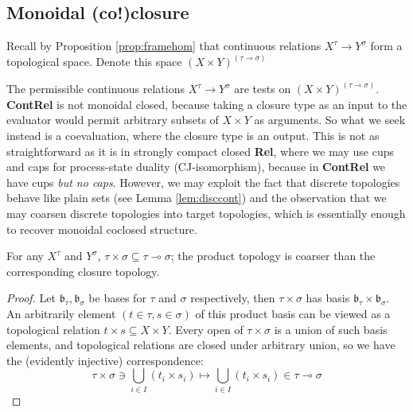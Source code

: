 \subsection{Monoidal (co!)closure}

\begin{defn}
Recall by Proposition \ref{prop:framehom} that continuous relations $X^\tau \rightarrow Y^\sigma$ form a topological space. Denote this space $(X \times Y)^{(\tau \multimap \sigma)}$
\end{defn}

The permissible continuous relations $X^\tau \rightarrow Y^\sigma$ are tests on $(X \times Y)^{(\tau \multimap \sigma)}$. \textbf{ContRel} is not monoidal closed, because taking a closure type as an input to the evaluator would permit arbitrary subsets of $X \times Y$ as arguments. So what we seek instead is a coevaluation, where the closure type is an output. This is not as straightforward as it is in strongly compact closed \textbf{Rel}, where we may use cups and caps for process-state duality (CJ-isomorphism), because in \textbf{ContRel} we have cups \emph{but no caps}. However, we may exploit the fact that discrete topologies behave like plain sets (see Lemma \ref{lem:disccont}) and the observation that we may coarsen discrete topologies into target topologies, which is essentially enough to recover monoidal coclosed structure.

\begin{proposition}\label{prop:prodvsclos}
For any $X^\tau$ and $Y^\sigma$, $\tau \times \sigma \subseteq \tau \multimap \sigma$; the product topology is coarser than the corresponding closure topology.
\begin{proof}
Let $\mathfrak{b}_\tau, \mathfrak{b}_\sigma$ be bases for $\tau$ and $\sigma$ respectively, then $\tau \times \sigma$ has basis $\mathfrak{b}_\tau \times \mathfrak{b}_\sigma$. An arbitrarily element $(t \in \tau, s \in \sigma)$ of this product basis can be viewed as a topological relation $t \times s \subseteq X \times Y$. Every open of $\tau \times \sigma$ is a union of such basis elements, and topological relations are closed under arbitrary union, so we have the (evidently injective) correspondence:
\[ \tau \times \sigma \ni \bigcup\limits_{i \in I}(t_i \times s_i) \mapsto \bigcup\limits_{i \in I}(t_i \times s_i) \in \tau \multimap \sigma \]
\end{proof}
\end{proposition}

